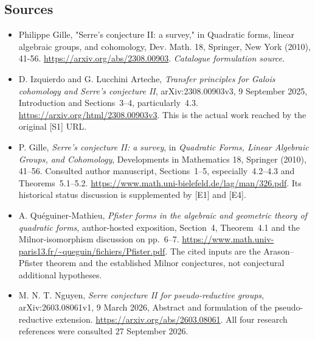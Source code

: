 \documentclass[11pt,a4paper]{article}
\numberwithin{equation}{section}
\begin{document}
\subsection{Sources}
\begin{itemize}\raggedright
\item[\textnormal{[S1]}]\hypertarget{source:statement:1}{} Philippe Gille, "Serre's conjecture II: a survey," in Quadratic forms, linear algebraic groups, and cohomology, Dev. Math. 18, Springer, New York (2010), 41-56.
\url{https://arxiv.org/abs/2308.00903}.
{\small\textit{Catalogue formulation source.}}
\item[\textnormal{[E1]}]\hypertarget{extra:statement:1}{}
D. Izquierdo and G. Lucchini Arteche, \emph{Transfer principles for Galois
cohomology and Serre's conjecture II}, arXiv:2308.00903v3,
9 September 2025, Introduction and Sections~3--4, particularly~4.3.
\url{https://arxiv.org/html/2308.00903v3}.
This is the actual work reached by the original [S1] URL.
\item[\textnormal{[E2]}]\hypertarget{extra:statement:2}{}
P. Gille, \emph{Serre's conjecture II: a survey}, in \emph{Quadratic Forms,
Linear Algebraic Groups, and Cohomology}, Developments in Mathematics
18, Springer (2010), 41--56. Consulted author manuscript,
Sections~1--5, especially~4.2--4.3 and Theorems~5.1--5.2.
\url{https://www.math.uni-bielefeld.de/lag/man/326.pdf}.
Its historical status discussion is supplemented by [E1] and [E4].
\item[\textnormal{[E3]}]\hypertarget{extra:statement:3}{}
A. Qu\'eguiner-Mathieu, \emph{Pfister forms in the algebraic and geometric
theory of quadratic forms}, author-hosted exposition, Section~4,
Theorem~4.1 and the Milnor-isomorphism discussion on pp.~6--7.
\url{https://www.math.univ-paris13.fr/~queguin/fichiers/Pfister.pdf}.
The cited inputs are the Arason--Pfister theorem and the established
Milnor conjectures, not conjectural additional hypotheses.
\item[\textnormal{[E4]}]\hypertarget{extra:statement:4}{}
M. N. T. Nguyen, \emph{Serre conjecture II for pseudo-reductive groups},
arXiv:2603.08061v1, 9 March 2026, Abstract and formulation of the
pseudo-reductive extension. \url{https://arxiv.org/abs/2603.08061}.
All four research references were consulted 27 September 2026.
\end{itemize}
\end{document}
